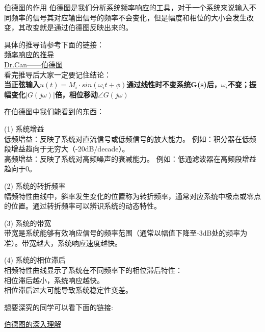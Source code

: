 \documentclass[UTF8,a4paper,12pt]{ctexart}
\begin{document}
    \begin{titlebox}{伯德图的作用}
      伯德图是我们分析系统频率响应的工具，对于一个系统来说输入不同频率的信号其对应输出信号的频率不会变化，但是幅度和相位的大小会发生改变，其改变就是通过伯德图反映出来的。
      
      具体的推导请参考下面的链接：\\
      \href{ https://www.bilibili.com/video/BV1Qb411W7i2?spm_id_from=333.788.videopod.sections&vd_source=b02f21f21dd17ebeef8dac9338c9d06c}{频率响应的推导}\\
      \href{https://www.bilibili.com/video/BV1gx411X7k6?spm_id_from=333.788.videopod.sections&vd_source=b02f21f21dd17ebeef8dac9338c9d06c}{Dr.Can——伯德图}\\
      看完推导后大家一定要记住结论：\\
      \textbf{当正弦输入$u(t)=M_i\cdot sin(\omega_it+\phi)$通过线性时不变系统G(s)后，$\omega_i$不变；振幅变化$|G(j\omega)|$倍，相位移动$\angle G(j\omega)$}\vspace{1cm}
      \label{sec:part2}
     
      在伯德图中我们能看到的东西：
     \begin{flushleft}
       (1) 系统增益\\
     低频增益：反映了系统对直流信号或低频信号的放大能力。
     例如：积分器在低频段增益趋向于无穷大（-20dB/decade）。\\
     高频增益：反映了系统对高频噪声的衰减能力。
     例如：低通滤波器在高频段增益趋向于0。
     \end{flushleft}
     \begin{flushleft}
      (2) 系统的转折频率\\
     幅频特性曲线中，斜率发生变化的位置称为转折频率，通常对应系统中极点或零点的位置。通过转折频率可以辨识系统的动态特性。
     \end{flushleft}
     \begin{flushleft}
       (3) 系统的带宽\\
     带宽是系统能够有效响应信号的频率范围（通常以幅值下降至-3dB处的频率为准）。带宽越大，系统响应速度越快。
     \end{flushleft}
     
    \begin{flushleft}
      (4) 系统的相位滞后\\
     相频特性曲线显示了系统在不同频率下的相位滞后特性：
     \\相位滞后越小，系统响应越快。
     \\相位滞后过大可能导致系统稳定性变差。
    \end{flushleft}
    \vspace{1cm}

     想要深究的同学可以看下面的链接:
     
     \href{https://www.bilibili.com/video/BV1C8UpYaEYN?spm_id_from=333.788.videopod.episodes&vd_source=b02f21f21dd17ebeef8dac9338c9d06c}{伯德图的深入理解}
     
    \end{titlebox}
\end{document}
